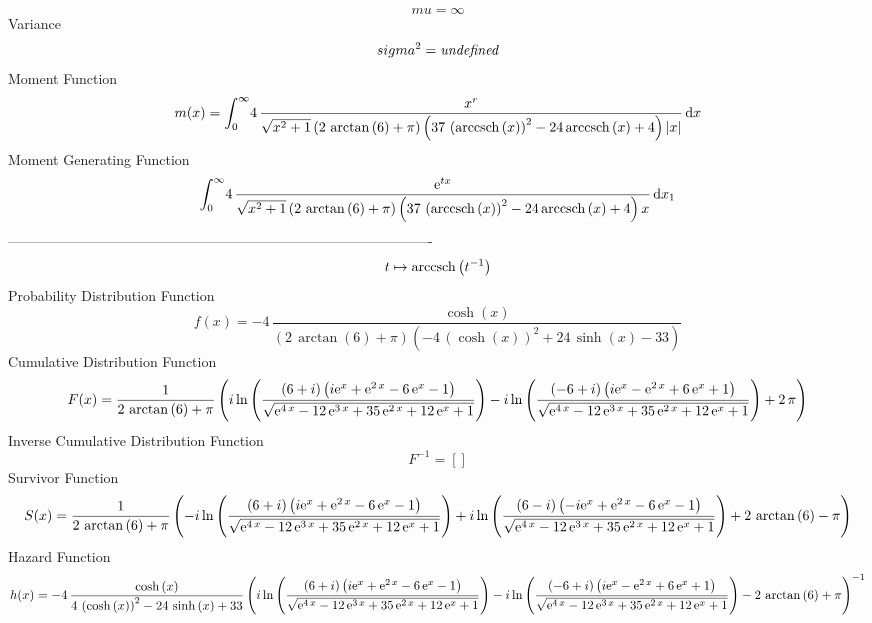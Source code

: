 \documentclass[12pt]{article}
\begin{document}
 $$ mu=\infty 
$$ Variance 
 $$ sigma^2 = {\it undefined}
$$Moment Function 
 $$ m(x) = \int_{0}^{\infty }\!4\,{\frac {{x}^{r}}{\sqrt {{x}^{2}+1} \left( 2\,
\arctan \left( 6 \right) +\pi \right)  \left( 37\, \left( 
{\rm arccsch} \left(x\right) \right) ^{2}-24\,{\rm arccsch} \left(x
\right)+4 \right)  \left| x \right| }}\,{\rm d}x
$$ Moment Generating Function 
 $$\int_{0}^{\infty }\!4\,{\frac {{{\rm e}^{tx}}}{\sqrt {{x}^{2}+1}
 \left( 2\,\arctan \left( 6 \right) +\pi \right)  \left( 37\, \left( 
{\rm arccsch} \left(x\right) \right) ^{2}-24\,{\rm arccsch} \left(x
\right)+4 \right) x}}\,{\rm d}x_{{1}}
$$-------------------------------------------------------------------------------------------  \\$$t\mapsto {\rm arccsch} \left({t}^{-1}\right)
$$Probability Distribution Function 
$$  f(x)=-4\,{\frac {\cosh \left( x \right) }{ \left( 2\,\arctan \left( 6
 \right) +\pi \right)  \left( -4\, \left( \cosh \left( x \right) 
 \right) ^{2}+24\,\sinh \left( x \right) -33 \right) }}
$$Cumulative Distribution Function  
 $$F(x)={\frac {1}{2\,\arctan \left( 6 \right) +\pi} \left( i\ln  \left( {
\frac { \left( 6+i \right)  \left( i{{\rm e}^{x}}+{{\rm e}^{2\,x}}-6\,
{{\rm e}^{x}}-1 \right) }{\sqrt {{{\rm e}^{4\,x}}-12\,{{\rm e}^{3\,x}}
+35\,{{\rm e}^{2\,x}}+12\,{{\rm e}^{x}}+1}}} \right) -i\ln  \left( {
\frac { \left( -6+i \right)  \left( i{{\rm e}^{x}}-{{\rm e}^{2\,x}}+6
\,{{\rm e}^{x}}+1 \right) }{\sqrt {{{\rm e}^{4\,x}}-12\,{{\rm e}^{3\,x
}}+35\,{{\rm e}^{2\,x}}+12\,{{\rm e}^{x}}+1}}} \right) +2\,\pi
 \right) }
$$ Inverse Cumulative Distribution Function 
  $$F^{-1} = []
$$Survivor Function 
 $$ S(x)={\frac {1}{2\,\arctan \left( 6 \right) +\pi} \left( -i\ln  \left( {
\frac { \left( 6+i \right)  \left( i{{\rm e}^{x}}+{{\rm e}^{2\,x}}-6\,
{{\rm e}^{x}}-1 \right) }{\sqrt {{{\rm e}^{4\,x}}-12\,{{\rm e}^{3\,x}}
+35\,{{\rm e}^{2\,x}}+12\,{{\rm e}^{x}}+1}}} \right) +i\ln  \left( {
\frac { \left( 6-i \right)  \left( -i{{\rm e}^{x}}+{{\rm e}^{2\,x}}-6
\,{{\rm e}^{x}}-1 \right) }{\sqrt {{{\rm e}^{4\,x}}-12\,{{\rm e}^{3\,x
}}+35\,{{\rm e}^{2\,x}}+12\,{{\rm e}^{x}}+1}}} \right) +2\,\arctan
 \left( 6 \right) -\pi \right) }
$$ Hazard Function 
 $$ h(x)=-4\,{\frac {\cosh \left( x \right) }{4\, \left( \cosh \left( x
 \right)  \right) ^{2}-24\,\sinh \left( x \right) +33} \left( i\ln 
 \left( {\frac { \left( 6+i \right)  \left( i{{\rm e}^{x}}+{{\rm e}^{2
\,x}}-6\,{{\rm e}^{x}}-1 \right) }{\sqrt {{{\rm e}^{4\,x}}-12\,{
{\rm e}^{3\,x}}+35\,{{\rm e}^{2\,x}}+12\,{{\rm e}^{x}}+1}}} \right) -i
\ln  \left( {\frac { \left( -6+i \right)  \left( i{{\rm e}^{x}}-{
{\rm e}^{2\,x}}+6\,{{\rm e}^{x}}+1 \right) }{\sqrt {{{\rm e}^{4\,x}}-
12\,{{\rm e}^{3\,x}}+35\,{{\rm e}^{2\,x}}+12\,{{\rm e}^{x}}+1}}}
 \right) -2\,\arctan \left( 6 \right) +\pi \right) ^{-1}}
$$
\end{document}
